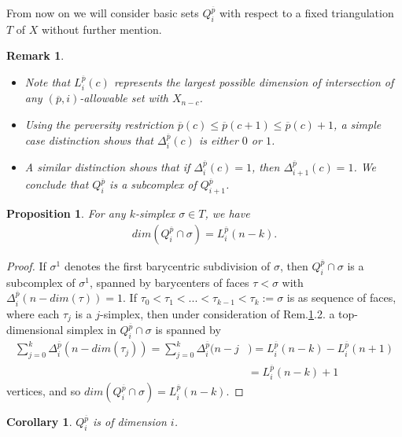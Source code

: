 \documentclass[11pt]{book}
\newtheorem{prop}{Proposition}
\newtheorem{remark}{Remark}
\newtheorem{corollar}{Corollary}
\begin{document}
From now on we will consider basic sets $Q_i^{\overline{p}}$ with respect to a fixed triangulation $T$ of $X$ without further mention.

\begin{remark}\label{remarkbasic}
\begin{itemize}
\item[1.] Note that $L_i^{\overline{p}}(c)$ represents the largest possible dimension of intersection of any $(\overline{p},i)$-allowable set with $X_{n-c}$.
\item[2.] Using the perversity restriction $\overline{p}(c) \leq \overline{p}(c+1) \leq \overline{p}(c)+1$, a simple case distinction shows that $\Delta_i^{\overline{p}}(c)$ is either $0$ or $1$.
\item[3.] A similar distinction shows that if $\Delta_i^{\overline{p}}(c)=1$, then $\Delta_{i+1}^{\overline{p}}(c)=1$. We conclude that $Q_i^{\overline{p}}$ is a subcomplex of $Q_{i+1}^{\overline{p}}$.
\end{itemize}
\end{remark}

\begin{prop}\label{dimensionbasicset}
For any $k$-simplex $\sigma \in T$, we have 
\begin{align*}
dim(Q_i^{\overline{p}} \cap \sigma)= L_i^{\overline{p}}(n-k).
\end{align*}
\end{prop}

\begin{proof}
If $\sigma^1$ denotes the first barycentric subdivision of $\sigma$, then $Q_i^{\overline{p}} \cap \sigma$ is a subcomplex of $\sigma^1$, spanned by barycenters of faces $\tau < \sigma$ with $\Delta_i^{\overline{p}}(n-dim(\tau))=1$. If $\tau_0 < \tau_1 < ... < \tau_{k-1} < \tau_k:= \sigma$ is as sequence of faces, where each $\tau_j$ is a $j$-simplex, then under consideration of Rem.\ref{remarkbasic}.2. a top-dimensional simplex in $Q_i^{\overline{p}} \cap \sigma$ is spanned by 
\begin{align*}
\sum_{j=0}^k \Delta_i^{\overline{p}}(n-dim(\tau_j)) = \sum_{j=0}^k \Delta_i^{\overline{p}}(n-j &)= L_i^{\overline{p}}(n-k) - L_i^{\overline{p}}(n+1) \\ &=L_i^{\overline{p}}(n-k) +1
\end{align*}
vertices, and so $dim(Q_i^{\overline{p}} \cap \sigma)= L_i^{\overline{p}}(n-k).$
\end{proof}

\begin{corollar}
$Q_i^{\overline{p}}$ is of dimension $i$.
\end{corollar}
\end{document}

